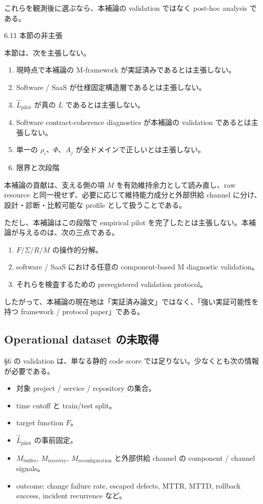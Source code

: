 \documentclass[12pt,a4paper]{article}
\begin{document}
これらを観測後に選ぶなら、本補論の validation ではなく post-hoc analysis である。

6.11 本節の非主張

本節は、次を主張しない。

\begin{enumerate}
\def\labelenumi{\arabic{enumi}.}
\item
  現時点で本補論の M-framework が実証済みであるとは主張しない。
\item
  Software / SaaS が仕様固定構造層であるとは主張しない。
\item
  \(\hat L_{\mathrm{pilot}}\) が真の \(L\) であるとは主張しない。
\item
  Software contract-coherence diagnostics が本補論の validation であるとは主張しない。
\item
  単一の \(\rho_i\)、\(\Phi\)、\(A_j\) が全ドメインで正しいとは主張しない。
\item
  限界と次段階
\end{enumerate}

本補論の貢献は、支える側の項 \(M\) を有効維持余力として読み直し、raw resource と同一視せず、必要に応じて維持能力成分と外部供給 channel に分け、設計・診断・比較可能な profile として扱うことである。

ただし、本補論はこの段階で empirical pilot を完了したとは主張しない。本補論が与えるのは、次の三点である。

\begin{enumerate}
\def\labelenumi{\arabic{enumi}.}
\tightlist
\item
  \(F / \Sigma / R / M\) の操作的分解。
\item
  software / SaaS における任意の component-based M diagnostic validation。
\item
  それらを検査するための preregistered validation protocol。
\end{enumerate}

したがって、本補論の現在地は「実証済み論文」ではなく、「強い実証可能性を持つ framework / protocol paper」である。

\subsection{Operational dataset の未取得}\label{operational-dataset-ux306eux672aux53d6ux5f97}

§6 の validation は、単なる静的 code score では足りない。少なくとも次の情報が必要である。

\begin{itemize}
\tightlist
\item
  対象 project / service / repository の集合。
\item
  time cutoff と train/test split。
\item
  target function \(F\)。
\item
  \(\hat L_{\mathrm{pilot}}\) の事前固定。
\item
  \(M_{\mathrm{buffer}}\), \(M_{\mathrm{recovery}}\), \(M_{\mathrm{reconfiguration}}\) と外部供給 channel の component / channel signals。
\item
  outcome: change failure rate, escaped defects, MTTR, MTTD, rollback success, incident recurrence など。
\end{itemize}
\end{document}
